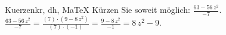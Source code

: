 \begin{MAufgabe}{Kuerzen}{kr, dh, MaTeX}
K\"urzen Sie soweit m\"oglich: $\frac{63 - 56\, z^2}{-7}$.\\ 
\ifLsg\MLoesung
\quad $\frac{63 - 56\, z^2}{-7}=\frac{(7)\cdot(9 - 8\, z^2)}{(7)\cdot(-1)}=\frac{9 - 8\, z^2}{-1}=8\, z^2 - 9$.\else\relax\fi
 \end{MAufgabe}